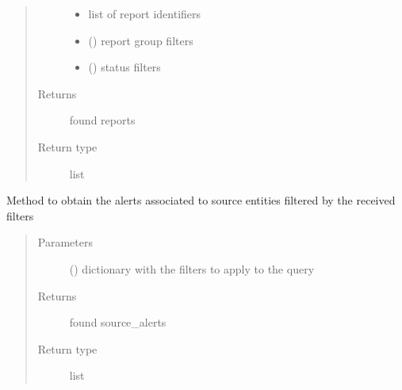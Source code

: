 \begin{fulllineitems}
\begin{fulllineitems}
\begin{quote}
\begin{description}
\begin{itemize}
\item {} 
 \textendash{} list of report identifiers

\item {} 
 () \textendash{} report group filters

\item {} 
 () \textendash{} status filters

\end{itemize}

\item[{Returns}] \leavevmode
found reports

\item[{Return type}] \leavevmode
list

\end{description}\end{quote}

\end{fulllineitems}


\begin{fulllineitems}
\label{\detokenize{eboa.engine:eboa.engine.query.Query.get_source_alerts}}
Method to obtain the alerts associated to source entities filtered by the received filters
\begin{quote}\begin{description}
\item[{Parameters}] \leavevmode
{} () \textendash{} dictionary with the filters to apply to the query

\item[{Returns}] \leavevmode
found source\_alerts

\item[{Return type}] \leavevmode
list

\end{description}\end{quote}

\end{fulllineitems}


\end{fulllineitems}
